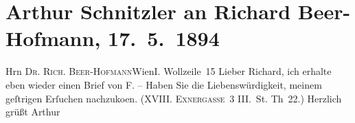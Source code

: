 

         
         \renewcommand{\erwaehntePersonen}{Personen: Richard Beer-Hofmann, Friedrich Michael Fels}
         \renewcommand{\erwaehnteOrte}{Orte: I., Innere Stadt, Krütznergasse, VIII., Josefstadt, Wien, Wollzeile}
         \renewcommand{\erwaehnteWerke}{}
               \section[Arthur Schnitzler an Richard Beer-Hofmann, 17. 5. 1894]{ Arthur Schnitzler an Richard Beer-Hofmann, 17. 5. 1894}\nopagebreak{}\rehead{ }\begin{ledgroupsized}[t]{13cm}\normalsize\beginnumbering{} \toendnotes[C]{\smallbreak\pagebreak[2]} 
\pstart{}{\pb}Hrn \textsc{Dr. Rich.
                     Beer-Hofmann}\pend{}\pstart{}Wien\pend{}\pstart{}I. Wollzeile 15\pend{}{\bigskip}\pstart
           \noindent{}{\pb}Lieber Richard, ich erhalte eben wieder
               einen Brief von \textsc{F.} – Haben Sie die Liebenswürdigkeit, meinem geſtrigen Erſuchen nachzuko{\geminationm}en. (\textsc{XVIII. Exnergasse 3} III. St. Th 22.)\pend
           \pstart Herzlich grüßt \spacefill\mbox{Arthur}\pend{}
         
         \endnumbering{}\end{ledgroupsized}  \newcommand{\dateiname}{L00327}\newcommand{\titel}{Arthur Schnitzler an Richard Beer-Hofmann, 17. 5. 1894}\newcommand{\editorInnen}{Martin Anton Müller und Gerd-Hermann Susen}
      